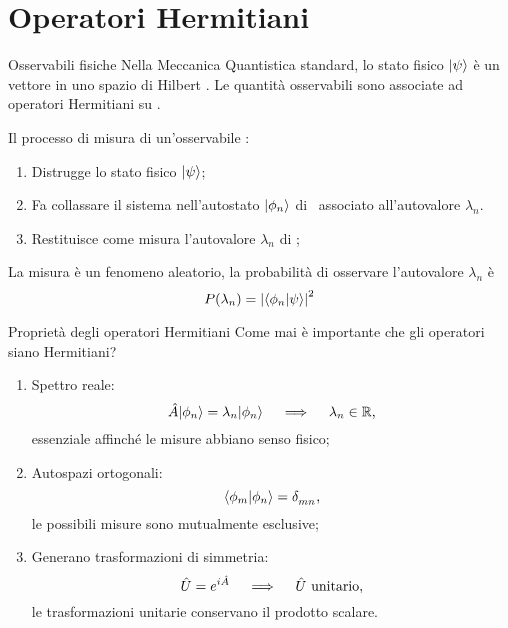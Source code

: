 \section{Operatori Hermitiani}
\begin{frame}{Osservabili fisiche}
    Nella Meccanica Quantistica standard, lo stato fisico $\ket{\psi}$ è un vettore in uno spazio di Hilbert \mcH. Le quantità osservabili sono associate ad operatori Hermitiani su \mcH.

    \pause
    Il processo di misura di un'osservabile \hA :
    \begin{enumerate}[label=\mybullet]
        \pause
        \item Distrugge lo stato fisico $\ket{\psi}$;
        \pause
        \item Fa collassare il sistema nell'autostato $\ket{\phi_n}$ di \hA\ associato all'autovalore $\lambda_n$.
        \pause
        \item Restituisce come misura l'autovalore $\lambda_n$ di \hA;
    \end{enumerate}
    \pause
    La misura è un fenomeno aleatorio, la probabilità di osservare l'autovalore $\lambda_n$ è
    \begin{equation*}
        P\pqty{\lambda_n} = \abs{\braket{\phi_n}{\psi}}^2
    \end{equation*}
\end{frame}

\begin{frame}{Proprietà degli operatori Hermitiani}
    Come mai è importante che gli operatori siano Hermitiani?
    \begin{enumerate}[label=\mybullet]
        \pause
        \item Spettro reale:
            \begin{equation*}
                \hat{A}\!\ket{\phi_n} = \lambda_n\!\ket{\phi_n}
                \quad\implies\quad
                \lambda_n \in \mathbb{R}
                \text{,}
            \end{equation*}
            essenziale affinché le misure abbiano senso fisico;
        \pause
        \item Autospazi ortogonali:
            \begin{equation*}
                \braket{\phi_m}{\phi_n} = \tensor{\delta}{_m_n}\mycomma
            \end{equation*}
            le possibili misure sono mutualmente esclusive;
        \pause
        \item Generano trasformazioni di simmetria:
            \begin{equation*}
                \hat{U} = e^{i\hat{A}}
                \quad\implies\quad
                \hat{U}~\text{unitario}
                \text{,}
            \end{equation*}
            le trasformazioni unitarie conservano il prodotto scalare.
    \end{enumerate}
\end{frame}


